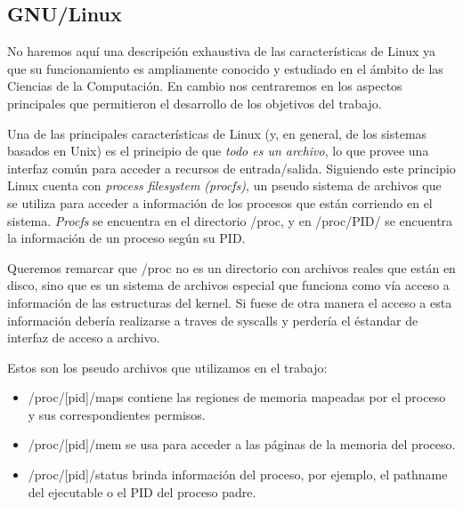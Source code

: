 \subsection{GNU/Linux}
No haremos aquí una descripción exhaustiva de las características de Linux ya que su funcionamiento es ampliamente conocido y estudiado en el ámbito de las Ciencias de la Computación. En cambio nos centraremos en los aspectos principales que permitieron el desarrollo de los objetivos del trabajo.

Una de las principales características de Linux (y, en general, de los sistemas basados en Unix) es el principio de que \textit{todo es un archivo}, lo que provee una interfaz común para acceder a recursos de entrada/salida. Siguiendo este principio Linux cuenta con \textit{process filesystem (procfs)}, un pseudo sistema de archivos que se utiliza para acceder a información de los procesos que están corriendo en el sistema. \textit{Procfs} se encuentra en el directorio /proc, y en /proc/PID/ se encuentra la información de un proceso según su PID.

Queremos remarcar que /proc no es un directorio con archivos reales que están en disco, sino que es un sistema de archivos especial que funciona como vía acceso a información de las estructuras del kernel. Si fuese de otra manera el acceso a esta información debería realizarse a traves de syscalls y perdería el éstandar de interfaz de acceso a archivo.

Estos son los pseudo archivos que utilizamos en el trabajo:

\begin{itemize}
 \item /proc/[pid]/maps contiene las regiones de memoria mapeadas por el proceso y sus correspondientes permisos.
 \item /proc/[pid]/mem se usa para acceder a las páginas de la memoria del proceso.
 \item /proc/[pid]/status brinda información del proceso, por ejemplo, el pathname del ejecutable o el PID del proceso padre.
\end{itemize}
